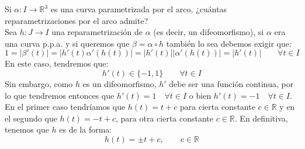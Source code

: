 \begin{ejercicio}
    Si $\alpha:I\to \mathbb{R}^3$ es una curva parametrizada por el arco, ¿cuántas reparametrizaciones por el arco admite?\\

    \noindent
    Sea $h:J\to I$ una reparametrización de $\alpha$ (es decir, un difeomorfismo), si $\alpha$ era una curva p.p.a. y si queremos que $\beta = \alpha\circ h$ también lo sea debemos exigir que:
    \begin{equation*}
        1 = |\beta'(t)| = |h'(t)\alpha'(h(t))| = |h'(t)||\alpha'(h(t))| = |h'(t)| \qquad \forall t\in I
    \end{equation*}
    En este caso, tendremos que:
    \begin{equation*}
        h'(t) \in \{-1,1\}\qquad \forall t\in I
    \end{equation*}
    Sin embargo, como $h$ es un difeomorfismo, $h'$ debe ser una función continua, por lo que tendremos entonces que $h'(t) = 1\quad \forall t\in I$ o bien $h'(t) = -1\quad \forall t\in I$. En el primer caso tendríamos que $h(t) = t+c$ para cierta constante $c\in \mathbb{R}$ y en el segundo que $h(t) = -t+c$, para otra cierta constante $c\in \mathbb{R}$. En definitiva, tenemos que $h$ es de la forma:
    \begin{equation*}
        h(t) = \pm t + c, \qquad c\in \mathbb{R}
    \end{equation*}
\end{ejercicio}

